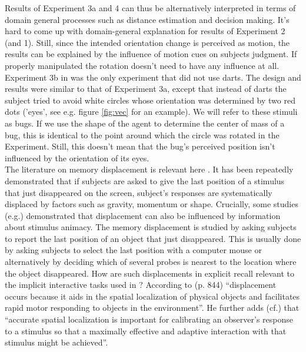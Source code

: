 \documentclass[10pt]{article}
\begin{document}
Results of Experiment 3a and 4 can thus be alternatively interpreted in terms of domain general processes such as distance estimation and decision making. 
It's hard to come up with domain-general explanation for results of Experiment 2 (and 1).
Still, since the intended orientation change is perceived as motion, the results can be explained by the influence of motion cues on subjects judgment. 
If properly manipulated the rotation doesn't need to have any influence at all.\\
Experiment 3b in \cite{gao10} was the only experiment that did not use darts. 
The design and results were similar to that of Experiment 3a, except that instead of darts the subject tried to avoid white circles whose orientation was determined by two red dots ('eyes', see e.g. figure \ref{fig:vec} for an example).
We will refer to these stimuli as bugs. 
If we use the shape of the agent to determine the center of mass of a bug, this is identical to the point around which the circle was rotated in the Experiment. 
Still, this doesn't mean that the bug's perceived position isn't influenced by the orientation of its eyes.\\
The literature on memory displacement is relevant here \cite{hubbard05}. 
It has been repeatedly demonstrated that if subjects are asked to give the last position of a stimulus that just disappeared on the screen, subject's responses are systematically displaced by factors such as gravity, momentum or shape. 
Crucially, some studies (e.g.\cite{freyd92}) demonstrated that displacement can also be influenced by information about stimulus animacy. 
The memory displacement is studied by asking subjects to report the last position of an object that just disappeared.
This is usually done by asking subjects to select the last position with a computer mouse or alternatively by deciding which of several probes is nearest to the location where the object disappeared.
How are such displacements in explicit recall relevant to the implicit interactive tasks used in \cite{gao10}?
According to \cite{hubbard05} (p. 844) ``displacement occurs because it aids in the spatial localization of physical objects and facilitates rapid motor responding to objects in the environment''. 
He further adds (cf.) that ``accurate spatial localization is important for calibrating an observer's response to a stimulus so that a maximally effective and adaptive interaction with that stimulus might be achieved''. 
\end{document}
